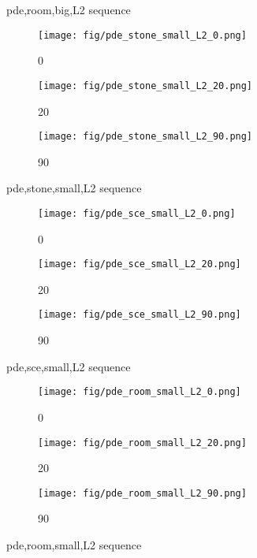 \begin{figure}
  \caption{pde,room,big,L2 sequence}
  \label{fig:three_images}
\end{figure}\begin{figure} 
    \centering
    \begin{subfigure}[b]{0.3\textwidth}
    \texttt{[image: fig/pde\_stone\_small\_L2\_0.png]}
    \caption{0}
    \label{fig:image1}
  \end{subfigure}
  \hfill
  \begin{subfigure}[b]{0.3\textwidth}
    \texttt{[image: fig/pde\_stone\_small\_L2\_20.png]}
    \caption{20}
    \label{fig:image2}
  \end{subfigure}
  \hfill
  \begin{subfigure}[b]{0.3\textwidth}
    \texttt{[image: fig/pde\_stone\_small\_L2\_90.png]}
    \caption{90}
    \label{fig:image3}
  \end{subfigure}

  \caption{pde,stone,small,L2 sequence}
  \label{fig:three_images}
\end{figure}\begin{figure} 
    \centering
    \begin{subfigure}[b]{0.3\textwidth}
    \texttt{[image: fig/pde\_sce\_small\_L2\_0.png]}
    \caption{0}
    \label{fig:image1}
  \end{subfigure}
  \hfill
  \begin{subfigure}[b]{0.3\textwidth}
    \texttt{[image: fig/pde\_sce\_small\_L2\_20.png]}
    \caption{20}
    \label{fig:image2}
  \end{subfigure}
  \hfill
  \begin{subfigure}[b]{0.3\textwidth}
    \texttt{[image: fig/pde\_sce\_small\_L2\_90.png]}
    \caption{90}
    \label{fig:image3}
  \end{subfigure}

  \caption{pde,sce,small,L2 sequence}
  \label{fig:three_images}
\end{figure}\begin{figure} 
    \centering
    \begin{subfigure}[b]{0.3\textwidth}
    \texttt{[image: fig/pde\_room\_small\_L2\_0.png]}
    \caption{0}
    \label{fig:image1}
  \end{subfigure}
  \hfill
  \begin{subfigure}[b]{0.3\textwidth}
    \texttt{[image: fig/pde\_room\_small\_L2\_20.png]}
    \caption{20}
    \label{fig:image2}
  \end{subfigure}
  \hfill
  \begin{subfigure}[b]{0.3\textwidth}
    \texttt{[image: fig/pde\_room\_small\_L2\_90.png]}
    \caption{90}
    \label{fig:image3}
  \end{subfigure}

  \caption{pde,room,small,L2 sequence}
  \label{fig:three_images}
\end{figure}